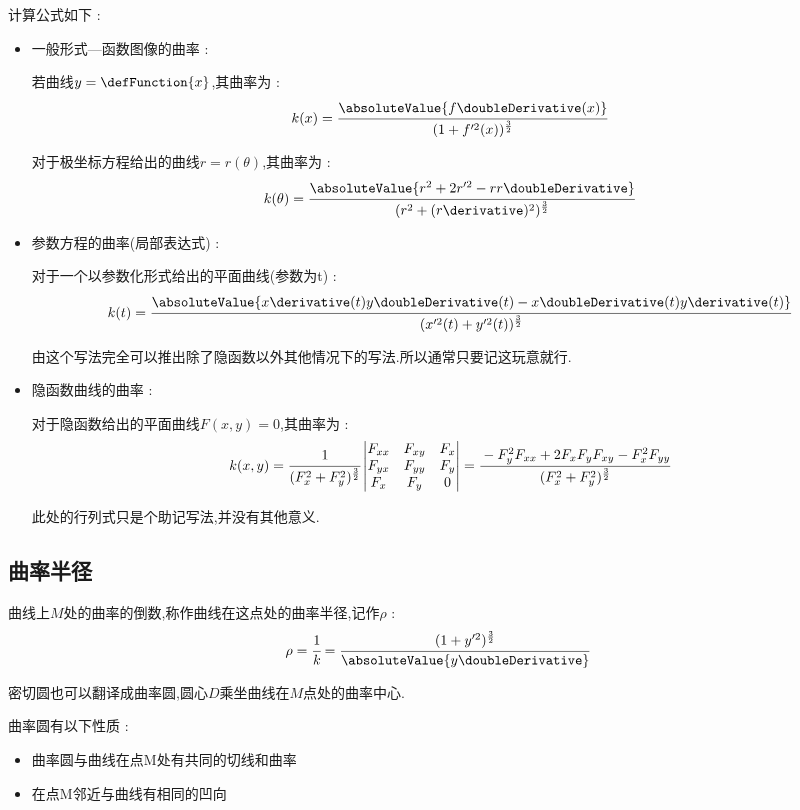 {{{  计算公式如下 :
  \begin{itemize}
    \item {
          一般形式---函数图像的曲率 :

          若曲线$y = \defFunction{x}$,其曲率为 : $$
            k(x) = \cfrac{\absoluteValue{f\doubleDerivative(x)}}{(1 + f^{\prime 2}(x))^{\frac{3}{2}}}
          $$

          对于极坐标方程给出的曲线$r = r(\theta)$,其曲率为 : $$
            k(\theta) = \cfrac{\absoluteValue{r^2 + 2r^{\prime 2} - rr\doubleDerivative}}{(r^2 + (r\derivative)^2)^{\frac{3}{2}}}
          $$
          }
    \item {
          参数方程的曲率(局部表达式) :

          对于一个以参数化形式给出的平面曲线(参数为t) : $$
            k(t) = \cfrac{\absoluteValue{x\derivative(t)y\doubleDerivative(t) - x\doubleDerivative(t)y\derivative(t)}}{(x^{\prime 2}(t) + y^{\prime 2}(t))^\frac{3}{2}}
          $$

          由这个写法完全可以推出除了隐函数以外其他情况下的写法.所以通常只要记这玩意就行.
          }
    \item {
          隐函数曲线的曲率 :

          对于隐函数给出的平面曲线$F(x,y) = 0$,其曲率为 : $$
            k(x,y) = \cfrac{1}{(F^2_x + F^2_y)^{\frac{3}{2}}}\begin{vmatrix}
              F_{xx} & F_{xy} & F_x \\
              F_{yx} & F_{yy} & F_y \\
              F_x    & F_y    & 0
            \end{vmatrix}
            =
            \cfrac{-F^2_yF_{xx} + 2F_xF_yF_{xy} - F^2_xF_{yy}}{(F^2_x + F^2_y)^{\frac{3}{2}}}
          $$

          此处的行列式只是个助记写法,并没有其他意义.
          }
  \end{itemize}
}%

\subsection{曲率半径}{
  曲线上$M$处的曲率的倒数,称作曲线在这点处的曲率半径,记作$\rho$ : $$
    \rho = \cfrac{1}{k} = \cfrac{(1 + y^{\prime 2})^{\frac{3}{2}}}{\absoluteValue{y\doubleDerivative}}
  $$

  密切圆也可以翻译成曲率圆,圆心$D$乘坐曲线在$M$点处的曲率中心.

  曲率圆有以下性质 : \begin{itemize}
    \item 曲率圆与曲线在点M处有共同的切线和曲率
    \item 在点M邻近与曲线有相同的凹向
  \end{itemize}

}}}

